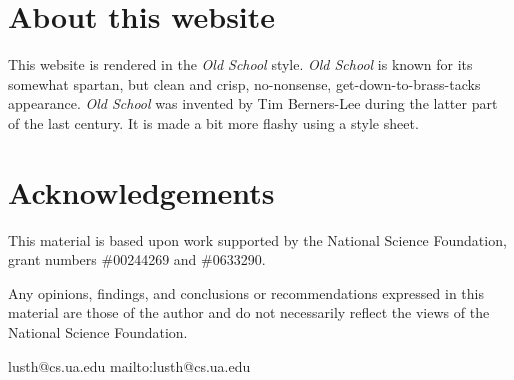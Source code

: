 \documentclass{article}
\begin{document}
\section*{About this website}
This website is rendered in the \emph{Old School} style.
\emph{Old School} is known for its somewhat spartan,
but clean and crisp, no-nonsense, get-down-to-brass-tacks
appearance. \emph{Old School} was invented by
Tim Berners-Lee during the latter part of the last 
century. It is made a bit more flashy using a
style sheet.

\section*{Acknowledgements}

This material is based upon work supported by the
National Science Foundation, grant numbers \#00244269 and \#0633290.

Any opinions, findings, and conclusions or recommendations
expressed in this material are those of the author and
do not necessarily reflect the views of the National Science Foundation.

\xlink
    {lusth@cs.ua.edu}
    {mailto:lusth@cs.ua.edu}
\end{document}
